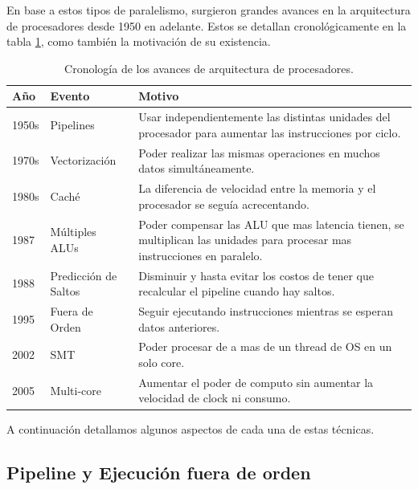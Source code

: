 En base a estos tipos de paralelismo, surgieron grandes avances en la arquitectura de procesadores desde 1950 en adelante. 
Estos se detallan cronol\'ogicamente en la tabla \ref{tbl:historia-cpu}, como tambi\'en la motivaci\'on de su existencia.

\newcommand{\blap}[1]{\begin{minipage}[t]{3in}#1\end{minipage}}


\begin{table}[h]
\renewcommand{\arraystretch}{2.0}
\centering
\begin{tabular}{lll}
\hline
A\~no & Evento & Motivo \\ \hline
1950s & Pipelines &  \blap{Usar independientemente las distintas unidades del procesador para aumentar las instrucciones por ciclo.} \\
1970s & Vectorizaci\'on & \blap{Poder realizar las mismas operaciones en muchos datos simult\'aneamente.} \\
1980s & Cach\'e & \blap{La diferencia de velocidad entre la memoria y el procesador se segu\'ia acrecentando.} \\
1987 & M\'ultiples ALUs & \blap{Poder compensar las ALU que mas latencia tienen, se multiplican las unidades para procesar mas instrucciones en paralelo.} \\
1988 & Predicci\'on de Saltos & \blap{Disminuir y hasta evitar los costos de tener que recalcular el pipeline cuando hay saltos.} \\
1995 & Fuera de Orden & \blap{Seguir ejecutando instrucciones mientras se esperan datos anteriores.} \\
2002 & SMT & \blap{Poder procesar de a mas de un thread de OS en un solo core.} \\
2005 & Multi-core & \blap{Aumentar el poder de computo sin aumentar la velocidad de clock ni consumo.} \\
\end{tabular}
  \caption{Cronolog\'ia de los avances de arquitectura de procesadores.}
  \label{tbl:historia-cpu}
\end{table}

A continuaci\'on detallamos algunos aspectos de cada una de estas t\'ecnicas.

\subsection{Pipeline y Ejecuci\'on fuera de orden}


